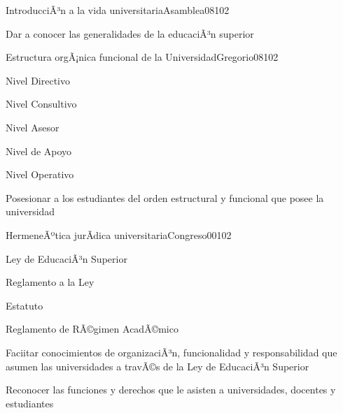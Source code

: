 \begin{syllabus}
\begin{unit}{IntroducciÃ³n a la vida universitaria}{Asamblea08}{10}{2}
   \begin{unitgoals}
      \item Dar a conocer las generalidades de la educaciÃ³n superior
   \end{unitgoals}
\end{unit}

\begin{unit}{Estructura orgÃ¡nica funcional de la Universidad}{Gregorio08}{10}{2}
   \begin{topics}
        \item Nivel Directivo
	\item Nivel Consultivo
	\item Nivel Asesor
	\item Nivel de Apoyo
	\item Nivel Operativo
  \end{topics}

   \begin{unitgoals}
      \item Posesionar a los estudiantes del orden estructural y funcional que posee la universidad
   \end{unitgoals}
\end{unit}

\begin{unit}{HermeneÃºtica jurÃ­dica universitaria}{Congreso00}{10}{2}
   \begin{topics}
        \item Ley de EducaciÃ³n Superior 
	\item Reglamento a la Ley
	\item Estatuto
	\item Reglamento de RÃ©gimen AcadÃ©mico
   \end{topics}

   \begin{unitgoals}
      \item Faciitar conocimientos de organizaciÃ³n, funcionalidad y responsabilidad que asumen las universidades a travÃ©s de la Ley de EducaciÃ³n Superior
      \item Reconocer las funciones y derechos que le asisten a universidades, docentes y estudiantes
   \end{unitgoals}
\end{unit}

\begin{learning-strategies}
\FGLearningStrategies
\end{learning-strategies}

\begin{evaluation}
\FGEvaluation
\end{evaluation}


\end{syllabus}
